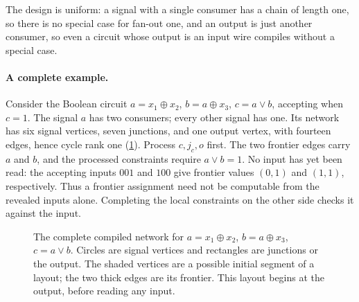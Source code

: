 \documentclass[11pt]{article}
\theoremstyle{plain}
\theoremstyle{definition}
\theoremstyle{remark}
\begin{document}
The design is uniform: a signal with a single consumer has a chain of length one, so there is
no special case for fan-out one, and an output is just another consumer, so even a circuit
whose output is an input wire compiles without a special case.

\paragraph{A complete example.}
Consider the Boolean circuit $a=x_1\oplus x_2$, $b=a\oplus x_3$, $c=a\vee b$, accepting when
$c=1$. The signal $a$ has two consumers; every other signal has one. Its network has six
signal vertices, seven junctions, and one output vertex, with fourteen edges, hence cycle
rank one (\cref{fig:compiler-example}). Process $c,j_c,o$ first. The two frontier edges carry
$a$ and $b$, and the processed constraints require $a\vee b=1$. No input has yet been read:
the accepting inputs $001$ and $100$ give frontier values $(0,1)$ and $(1,1)$, respectively.
Thus a frontier assignment need not be computable from the revealed inputs alone. Completing
the local constraints on the other side checks it against the input.

\begin{figure}[htbp]
\centering
{}
\caption{The complete compiled network for $a=x_1\oplus x_2$, $b=a\oplus x_3$,
$c=a\vee b$. Circles are signal vertices and rectangles are junctions or the output.
The shaded vertices are a possible initial segment of a layout; the two thick edges are its
frontier. This layout begins at the output, before reading any input.}
\label{fig:compiler-example}
\end{figure}
\end{document}
